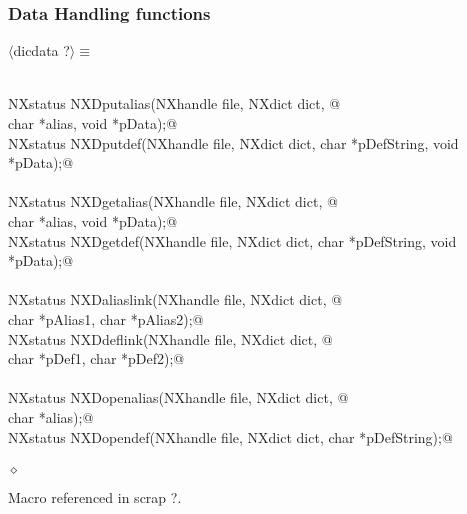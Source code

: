 \documentclass[12pt]{article}
\begin{document}
\subsubsection{Data Handling functions}
\begin{flushleft} \small
\begin{minipage}{\linewidth} \label{scrap3}
$\langle$dicdata {\footnotesize ?}$\rangle\equiv$
\vspace{-1ex}
\begin{list}{}{} \item
\mbox{}\verb@@\\
\mbox{}\verb@   NXstatus NXDputalias(NXhandle file, NXdict dict, @\\
\mbox{}\verb@                        char *alias, void *pData);@\\
\mbox{}\verb@   NXstatus NXDputdef(NXhandle file, NXdict dict, char *pDefString, void *pData);@\\
\mbox{}\verb@@\\
\mbox{}\verb@   NXstatus NXDgetalias(NXhandle file, NXdict dict, @\\
\mbox{}\verb@                        char *alias, void *pData);@\\
\mbox{}\verb@   NXstatus NXDgetdef(NXhandle file, NXdict dict, char *pDefString, void *pData);@\\
\mbox{}\verb@@\\
\mbox{}\verb@   NXstatus NXDaliaslink(NXhandle file, NXdict dict, @\\
\mbox{}\verb@                         char *pAlias1, char *pAlias2);@\\
\mbox{}\verb@   NXstatus NXDdeflink(NXhandle file, NXdict dict, @\\
\mbox{}\verb@                         char *pDef1, char *pDef2);@\\
\mbox{}\verb@@\\
\mbox{}\verb@   NXstatus NXDopenalias(NXhandle file, NXdict dict, @\\
\mbox{}\verb@                        char *alias);@\\
\mbox{}\verb@   NXstatus NXDopendef(NXhandle file, NXdict dict, char *pDefString);@\\
\mbox{}\verb@@\\
\mbox{}\verb@@$\diamond$
\end{list}
\vspace{-1ex}
\footnotesize\addtolength{\baselineskip}{-1ex}
\begin{list}{}{\setlength{\itemsep}{-\parsep}\setlength{\itemindent}{-\leftmargin}}
\item Macro referenced in scrap ?.
\end{list}
\end{minipage}\\[4ex]
\end{flushleft}
\end{document}
